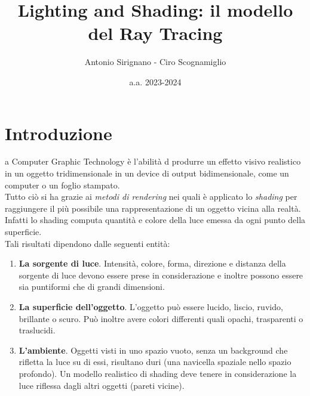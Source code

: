 \documentclass[9pt,a4paper,twoside]{tau}
\title{Lighting and Shading: il modello del Ray Tracing}
\author{Antonio Sirignano - Ciro Scognamiglio}
\date{a.a. 2023-2024}
\begin{document}
		
	\maketitle
	\thispagestyle{firststyle}
	\tauabstract
	\tableofcontents


\section{Introduzione}

    a Computer Graphic Technology è l'abilità d produrre un effetto visivo realistico in un oggetto tridimensionale in un device di output bidimensionale, come un computer o un foglio stampato.\\
    Tutto ciò si ha grazie ai \textit{metodi di rendering} nei quali è applicato lo \textit{shading} per raggiungere il più possibile una rappresentazione di un oggetto vicina alla realtà.\\ 
    Infatti lo shading computa quantità e colore della luce emessa da ogni punto della superficie.\\
    Tali risultati dipendono dalle seguenti entità:
    \begin{enumerate}
    	\item \textbf{La sorgente di luce}. Intensità, colore, forma, direzione e distanza della sorgente di luce devono essere prese in considerazione e inoltre possono essere sia puntiformi che di grandi dimensioni.
    	\item \textbf{La superficie dell'oggetto}. L'oggetto può essere lucido, liscio, ruvido, brillante o scuro. Può inoltre avere colori differenti quali opachi, trasparenti o traslucidi. 
    	\item \textbf{L'ambiente}. Oggetti visti in uno spazio vuoto, senza un background che rifletta la luce su di essi, risultano duri (una navicella spaziale nello spazio profondo). Un modello realistico di shading deve tenere in considerazione la luce riflessa dagli altri oggetti (pareti vicine).
    \end{enumerate}
\end{document}
